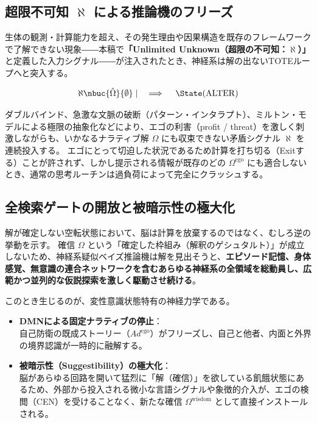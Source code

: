\subsection{超限不可知 $\aleph$ による推論機のフリーズ}
生体の観測・計算能力を超え、その発生理由や因果構造を既存のフレームワークで了解できない現象――本稿で\textbf{「Unlimited Unknown（超限の不可知：$\aleph$）」}と定義した入力シグナル――が注入されたとき、神経系は解の出ないTOTEループへと突入する。

\begin{equation}
    \aleph \nbuc{\hat{\Omega}}{\emptyset} \mid \quad \implies \quad \State(\mathrm{ALTER})
\end{equation}

ダブルバインド、急激な文脈の破断（パターン・インタラプト）、ミルトン・モデルによる極限の抽象化などにより、エゴの利害（profit / threat）を激しく刺激しながらも、いかなるナラティブ解 $\Omega$ にも収束できない矛盾シグナル $\aleph$ を連続投入する。
エゴにとって切迫した状況であるため計算を打ち切る（Exitする）ことが許されず、しかし提示される情報が既存のどの $\Omega^{\mathrm{ego}}$ にも適合しないとき、通常の思考ルーチンは過負荷によって完全にクラッシュする。

\subsection{全検索ゲートの開放と被暗示性の極大化}
解が確定しない空転状態において、脳は計算を放棄するのではなく、むしろ逆の挙動を示す。
確信 $\Omega$ という「確定した枠組み（解釈のゲシュタルト）」が成立しないため、神経系疑似ベイズ推論機は解を見出そうと、\textbf{エピソード記憶、身体感覚、無意識の連合ネットワークを含むあらゆる神経系の全領域を総動員し、広範かつ並列的な仮説探索を激しく駆動させ続ける}。

このとき生じるのが、変性意識状態特有の神経力学である。
\begin{itemize}
    \item \textbf{DMNによる固定ナラティブの停止}：\\
    自己防衛の既成ストーリー（$Ad^{\mathrm{ego}}$）がフリーズし、自己と他者、内面と外界の境界認識が一時的に融解する。
    \item \textbf{被暗示性（Suggestibility）の極大化}：\\
    脳があらゆる回路を開いて猛烈に「解（確信）」を欲している飢餓状態にあるため、外部から投入される微小な言語シグナルや象徴的介入が、エゴの検閲（CEN）を受けることなく、新たな確信 $\Omega^{\mathrm{wisdom}}$ として直接インストールされる。
\end{itemize}

